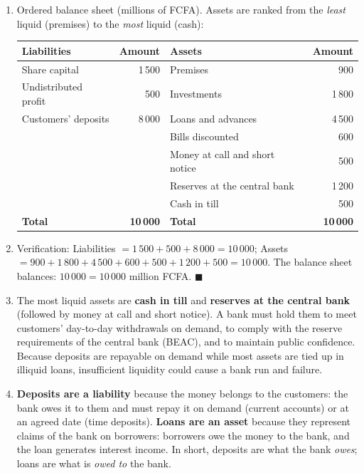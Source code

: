 \documentclass[11pt]{article}
\begin{document}
\begin{corrige}
\begin{enumerate}
\item Ordered balance sheet (millions of FCFA). Assets are ranked from the \emph{least} liquid (premises) to the \emph{most} liquid (cash):
\begin{center}
\begin{tabular}{|l|r|l|r|}
\hline
\rowcolor{popblueL} \textbf{Liabilities} & \textbf{Amount} & \textbf{Assets} & \textbf{Amount} \\
\hline
Share capital & 1\,500 & Premises & 900 \\
\hline
Undistributed profit & 500 & Investments & 1\,800 \\
\hline
Customers' deposits & 8\,000 & Loans and advances & 4\,500 \\
\hline
 & & Bills discounted & 600 \\
\hline
 & & Money at call and short notice & 500 \\
\hline
 & & Reserves at the central bank & 1\,200 \\
\hline
 & & Cash in till & 500 \\
\hline
\textbf{Total} & \textbf{10\,000} & \textbf{Total} & \textbf{10\,000} \\
\hline
\end{tabular}
\end{center}
\item Verification: Liabilities $= 1\,500 + 500 + 8\,000 = 10\,000$; Assets $= 900 + 1\,800 + 4\,500 + 600 + 500 + 1\,200 + 500 = 10\,000$. The balance sheet balances: $10\,000 = 10\,000$ million FCFA. $\blacksquare$
\item The most liquid assets are \textbf{cash in till} and \textbf{reserves at the central bank} (followed by money at call and short notice). A bank must hold them to meet customers' day-to-day withdrawals on demand, to comply with the reserve requirements of the central bank (BEAC), and to maintain public confidence. Because deposits are repayable on demand while most assets are tied up in illiquid loans, insufficient liquidity could cause a bank run and failure.
\item \textbf{Deposits are a liability} because the money belongs to the customers: the bank owes it to them and must repay it on demand (current accounts) or at an agreed date (time deposits). \textbf{Loans are an asset} because they represent claims of the bank on borrowers: borrowers owe the money to the bank, and the loan generates interest income. In short, deposits are what the bank \emph{owes}; loans are what is \emph{owed to} the bank.
\end{enumerate}
\end{corrige}
\end{document}
